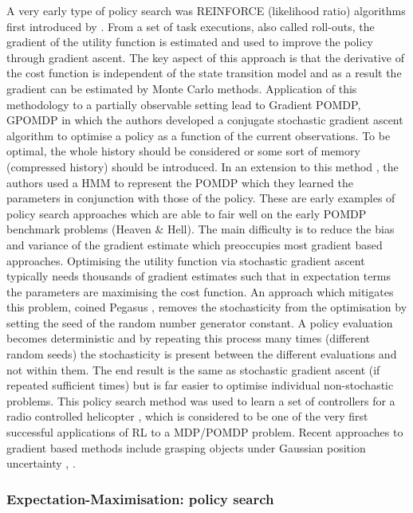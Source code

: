 A very early type of policy search was REINFORCE (likelihood ratio) algorithms
first introduced by \cite{reinforce_1992}. From a set of task executions, also called roll-outs, the gradient
of the utility function is estimated and used to improve the policy through gradient ascent. 
The key aspect of this approach is that the derivative of the cost function is independent of the state transition model 
and as a result the gradient can be estimated by Monte Carlo methods. Application of this methodology 
to a partially observable setting lead to Gradient POMDP, GPOMDP \cite{gpomdp_2000} in which the authors developed 
a conjugate stochastic gradient ascent algorithm to optimise a policy as a function of the current observations.
To be optimal, the whole history should be considered or some sort of memory (compressed history) should be introduced. 
In an extension to this method \cite{sis_pomdp_2002}, the authors used a HMM to represent the POMDP which they 
learned the parameters in conjunction with those of the policy. These are early examples of policy search approaches 
which are able to fair well on the early POMDP benchmark problems (Heaven \& Hell). 
The main difficulty is to reduce the bias and variance of the gradient estimate which preoccupies most gradient based approaches. 
Optimising the utility function via stochastic gradient ascent typically needs thousands of gradient estimates such that in expectation terms the parameters are maximising the cost function. 
An approach which mitigates this problem, coined Pegasus \cite{Pegasus_2000}, removes the stochasticity from the optimisation 
by setting the seed of the random number generator constant. A policy evaluation becomes deterministic and by repeating this process many times (different random seeds) the stochasticity
is present between the different evaluations and not within them. The end result is the same as stochastic gradient ascent 
(if repeated sufficient times) but is far easier to optimise individual non-stochastic problems. This policy search 
method was used to learn a set of controllers for a radio controlled helicopter \cite{heli_2004}, which is considered to 
be one of the very first successful applications of RL to a MDP/POMDP problem. Recent approaches to gradient based methods
include grasping objects under Gaussian position uncertainty \cite{dmp_iros_2011}, \cite{dmp_seq_2012}.

\subsubsection{Expectation-Maximisation: policy search}

